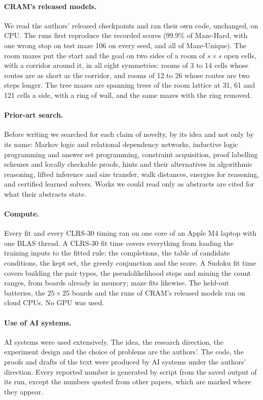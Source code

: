 \documentclass[10pt]{article}
\begin{document}
\paragraph{CRAM's released models.} We read the authors' released checkpoints and ran their own code, unchanged, on CPU.
The runs first reproduce the recorded scores (99.9\% of Maze-Hard, with one wrong stop on test maze 106 on
every seed, and all of Maze-Unique). The room mazes put the start and the goal on two sides of a room of $s\times s$ open
cells, with a corridor around it, in all eight symmetries: rooms of 3 to 14 cells whose routes are as short as the
corridor, and rooms of 12 to 26 whose routes are two steps longer. The tree mazes are spanning trees of the room
lattice at 31, 61 and 121 cells a side, with a ring of wall, and the same mazes with the ring removed. 

\paragraph{Prior-art search.} Before writing we searched for each claim of novelty, by its idea and not only by its
name: Markov logic and relational dependency networks, inductive logic programming and answer set programming,
constraint acquisition, proof labelling schemes and locally checkable proofs, hints and their alternatives in
algorithmic reasoning, lifted inference and size transfer, walk distances, energies for reasoning, and certified
learned solvers. Works we could read only as abstracts are cited for what their abstracts state.

\paragraph{Compute.} Every fit and every CLRS-30 timing ran on one core of an Apple M4 laptop with one BLAS thread. A
CLRS-30 fit time covers everything from loading the training inputs to the fitted rule: the completions, the table of
candidate conditions, the kept set, the greedy conjunction and the score. A Sudoku fit time covers building the pair
types, the pseudolikelihood steps and mining the count ranges, from boards already in memory; maze fits likewise. The
held-out batteries, the $25\times25$ boards and the runs of CRAM's released models ran on cloud CPUs. No GPU was used.

\paragraph{Use of AI systems.} AI systems were used extensively. The idea, the research direction, the experiment design
and the choice of problems are the authors'. The code, the proofs and drafts of the text were produced by AI systems
under the authors' direction. Every reported number is generated by script from the saved output of its run, except
the numbers quoted from other papers, which are marked where they appear.
\end{document}
